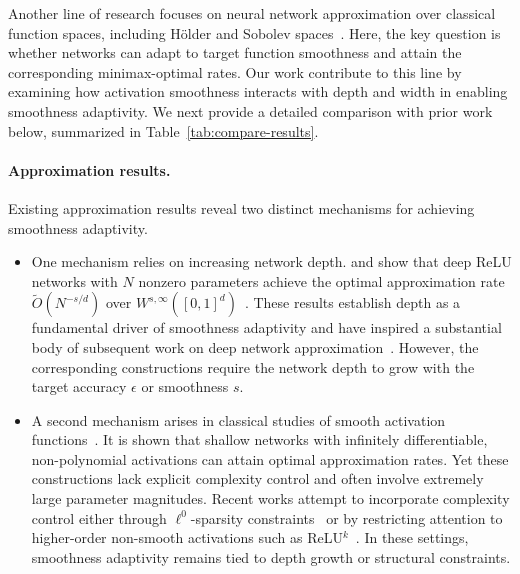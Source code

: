 \documentclass[11pt]{article}
\begin{document}
Another line of research focuses on neural network approximation over classical function spaces, including Hölder and Sobolev spaces~\citep{mhaskar1995degree,mhaskar1996neural,pinkus1999approximation}. Here, the key question is whether networks can adapt to target function smoothness and attain the corresponding minimax-optimal rates. 
Our work contribute to this line by examining how activation smoothness interacts with depth and width in enabling smoothness adaptivity. We next provide a detailed comparison with prior work below, summarized in Table~\ref{tab:compare-results}.



\paragraph{Approximation results.}
Existing approximation results reveal two distinct mechanisms for achieving smoothness adaptivity.
\begin{itemize}
    \item One mechanism relies on increasing network depth. 
\citet{yarotsky2017error} and \citet{liang2017deep} show that deep ReLU networks with $N$ nonzero parameters achieve the optimal approximation rate $\tilde{O}(N^{-s/d})$ over $W^{s,\infty}([0,1]^d)$~\citep{devore1989optimal}. 
These results establish depth as a fundamental driver of smoothness adaptivity and have inspired a substantial body of subsequent work on deep network approximation~\citep{petersen2018optimal,Bolcskei2019optimal,shen2019nonlinear,Shen_2020,guhring2020error,kohler2021rate,lu2021deep,suzuki2021deep,gribonval2022approximation,hon2022simultaneous,kohler2022estimation,shen2022optimal,kohler2023estimation,siegel2023optimal,yang2023nearly,zhang2024classification,zhang2024deep,liu2025deep,yang2025deep}. 
However, the corresponding constructions require the network depth to grow with the target accuracy $\epsilon$ or smoothness $s$.
\item A second mechanism arises in classical studies of smooth activation functions~\citep{mhaskar1996neural,pinkus1999approximation}.  It is shown that shallow networks with infinitely differentiable, non-polynomial activations can attain optimal approximation rates. 
Yet these constructions lack explicit complexity control and often involve extremely large parameter magnitudes.
Recent works attempt to incorporate complexity control either through $\ell^0$-sparsity constraints~\citep{de2021approximation} or by restricting attention to higher-order non-smooth activations such as ReLU$^k$~\citep{mao2024approximation,yang2025optimal}. 
In these settings, smoothness adaptivity remains tied to depth growth or structural constraints.
\end{itemize}
\end{document}
